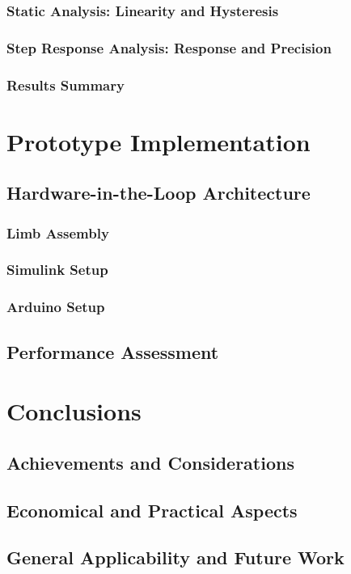         \subsection{Static Analysis: Linearity and Hysteresis}
        \subsection{Step Response Analysis: Response and Precision}
        \subsection{Results Summary}

\chapter{Prototype Implementation}
    \section{Hardware-in-the-Loop Architecture}
        \subsection{Limb Assembly}
        \subsection{Simulink Setup}
        \subsection{Arduino Setup}
    \section{Performance Assessment}

\chapter{Conclusions}
    \section{Achievements and Considerations}
    \section{Economical and Practical Aspects}
    \section{General Applicability and Future Work}

